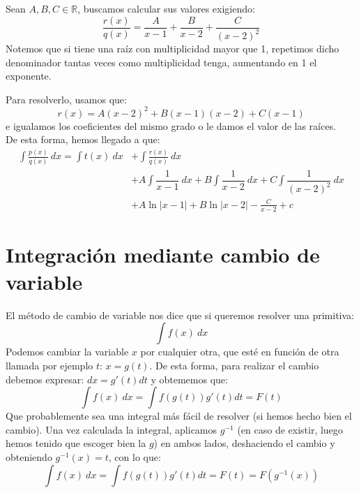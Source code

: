Sean $A,B,C\in \mathbb{R}$, buscamos calcular sus valores exigiendo:
\begin{equation*}
    \dfrac{r(x)}{q(x)} = \dfrac{A}{x-1} + \dfrac{B}{x-2} + \dfrac{C}{{(x-2)}^{2}}
\end{equation*}
Notemos que si tiene una raíz con multiplicidad mayor que 1, repetimos dicho denominador tantas veces como multiplicidad tenga, aumentando en 1 el exponente.

Para resolverlo, usamos que:
\begin{equation*}
    r(x) = A{(x-2)}^{2} + B(x-1)(x-2) + C(x-1)
\end{equation*}
e igualamos los coeficientes del mismo grado o le damos el valor de las raíces.\\

\noindent
De esta forma, hemos llegado a que:
\begin{align*}
    \displaystyle\int \frac{p(x)}{q(x)}~dx  = \displaystyle\int t(x)~dx  &+ \displaystyle\int \frac{r(x)}{q(x)}~dx  \\
                                            &+ A \displaystyle\int \dfrac{1}{x-1}~dx  + B\displaystyle\int \dfrac{1}{x-2}~dx  + C\displaystyle\int \dfrac{1}{{(x-2)}^{2}}~dx \\
                                            &+ A\ln|x-1| + B\ln|x-2| -\frac{C}{x-2} + c
\end{align*}

\section{Integración mediante cambio de variable}
El método de cambio de variable nos dice que si queremos resolver una primitiva:
\begin{equation*}
    \displaystyle\int f(x)~dx  
\end{equation*}
Podemos cambiar la variable $x$ por cualquier otra, que esté en función de otra llamada por ejemplo $t$: $x = g(t)$. De esta forma, para realizar el cambio debemos expresar: $dx = g'(t)dt$ y obtememos que:
\begin{equation*}
    \displaystyle\int f(x)~dx  = \displaystyle\int f(g(t))g'(t)dt = F(t)
\end{equation*}
Que probablemente sea una integral más fácil de resolver (si hemos hecho bien el cambio). Una vez calculada la integral, aplicamos $g^{-1}$ (en caso de existir, luego hemos tenido que escoger bien la $g$) en ambos lados, deshaciendo el cambio y obteniendo $g^{-1}(x) = t$, con lo que:
\begin{equation*}
    \displaystyle\int f(x)~dx  = \displaystyle\int f(g(t))g'(t)dt = F(t) = F(g^{-1}(x))
\end{equation*}

